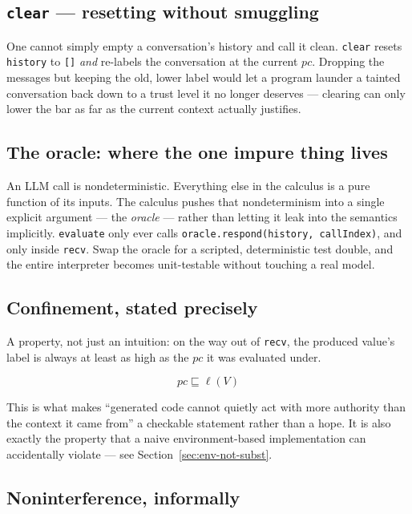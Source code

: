 \documentclass[11pt, a4paper]{article}
\newcommand{\flowsto}{\sqsubseteq}
\begin{document}
\subsection{\texttt{clear} --- resetting without smuggling}

One cannot simply empty a conversation's history and call it clean.
\lstinline{clear} resets \lstinline{history} to \lstinline{[]} \emph{and}
re-labels the conversation at the current $pc$. Dropping the messages but
keeping the old, lower label would let a program launder a tainted
conversation back down to a trust level it no longer deserves --- clearing
can only lower the bar as far as the current context actually justifies.

\subsection{The oracle: where the one impure thing lives}

An LLM call is nondeterministic. Everything else in the calculus is a
pure function of its inputs. The calculus pushes that nondeterminism into
a single explicit argument --- the \emph{oracle} --- rather than letting
it leak into the semantics implicitly. \lstinline{evaluate} only ever
calls \lstinline{oracle.respond(history, callIndex)}, and only inside
\lstinline{recv}. Swap the oracle for a scripted, deterministic test
double, and the entire interpreter becomes unit-testable without touching
a real model.

\subsection{Confinement, stated precisely}

A property, not just an intuition: on the way out of \lstinline{recv},
the produced value's label is always at least as high as the $pc$ it was
evaluated under.

\[
pc \flowsto \ell(V)
\]

This is what makes ``generated code cannot quietly act with more
authority than the context it came from'' a checkable statement rather
than a hope. It is also exactly the property that a naive
environment-based implementation can accidentally violate --- see
Section~\ref{sec:env-not-subst}.

\subsection{Noninterference, informally}
\end{document}
